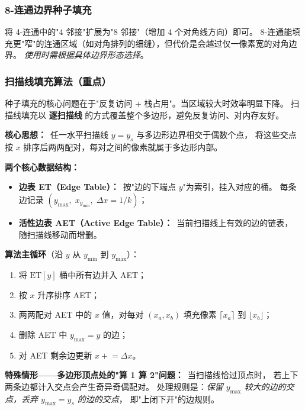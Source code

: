 \documentclass[a4paper,12pt]{ctexart}
\begin{document}
\subsubsection{8-连通边界种子填充}

将 4-连通中的"$4$ 邻接"扩展为"$8$ 邻接"（增加 $4$ 个对角线方向）即可。
$8$-连通能填充更"窄"的连通区域（如对角排列的细缝），但代价是会越过仅一像素宽的对角边界。
\emph{使用时需根据具体边界形态选择}。

\subsubsection{扫描线填充算法（重点）}

种子填充的核心问题在于"反复访问 + 栈占用"。当区域较大时效率明显下降。
扫描线填充以 \textbf{逐扫描线} 的方式覆盖整个多边形，避免反复访问、对内存友好。

\textbf{核心思想：}\ 任一水平扫描线 $y=y_s$ 与多边形边界相交于偶数个点，
将这些交点按 $x$ 排序后两两配对，每对之间的像素就属于多边形内部。

\textbf{两个核心数据结构：}
\begin{itemize}[leftmargin=2em,itemsep=0.2em]
    \item \textbf{边表 ET（Edge Table）：}\ 按"边的下端点 $y$"为索引，挂入对应的桶。
        每条边记录 $(y_{\max},\;x_{y_{\min}},\;\Delta x = 1/k)$；
    \item \textbf{活性边表 AET（Active Edge Table）：}\ 当前扫描线上有效的边的链表，
        随扫描线移动而增删。
\end{itemize}

\textbf{算法主循环}（沿 $y$ 从 $y_{\min}$ 到 $y_{\max}$）：
\begin{enumerate}[leftmargin=2em,itemsep=0.2em]
    \item 将 $\mathrm{ET}[y]$ 桶中所有边并入 AET；
    \item 按 $x$ 升序排序 AET；
    \item 两两配对 AET 中的 $x$ 值，对每对 $(x_a,x_b)$ 填充像素 $\lceil x_a\rceil$ 到 $\lfloor x_b\rfloor$；
    \item 删除 AET 中 $y_{\max}=y$ 的边；
    \item 对 AET 剩余边更新 $x \mathrel{+}= \Delta x$。
\end{enumerate}

\textbf{特殊情形——多边形顶点处的"算 1 算 2"问题：}\ 当扫描线恰过顶点时，
若上下两条边都计入交点会产生奇异奇偶配对。
处理规则是：\emph{保留 $y_{\max}$ 较大的边的交点，丢弃 $y_{\max}=y_s$ 的边的交点}，
即"上闭下开"的边规则。
\end{document}
